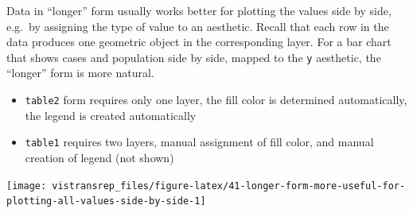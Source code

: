 \documentclass[]{book}
\newenvironment{Shaded}{}{}
\newcommand{\DataTypeTok}[1]{#1}
\newcommand{\KeywordTok}[1]{\textcolor[rgb]{0.00,0.00,1.00}{#1}}
\newcommand{\NormalTok}[1]{#1}
\newcommand{\OperatorTok}[1]{#1}
\newcommand{\StringTok}[1]{\textcolor[rgb]{0.00,0.50,0.50}{#1}}
\providecommand{\tightlist}{%
  \setlength{\itemsep}{0pt}\setlength{\parskip}{0pt}}
\begin{document}
Data in ``longer'' form usually works better for plotting the values side by side, e.g.~by assigning the type of value to an aesthetic.
Recall that each row in the data produces one geometric object in the corresponding layer.
For a bar chart that shows cases and population side by side, mapped to the \texttt{y} aesthetic, the ``longer'' form is more natural.

\begin{itemize}
\tightlist
\item
  \texttt{table2} form requires only one layer, the fill color is determined automatically, the legend is created automatically
\item
  \texttt{table1} requires two layers, manual assignment of fill color, and manual creation of legend (not shown)
\end{itemize}

\begin{Shaded}
\end{Shaded}

\begin{flushright}\texttt{[image: vistransrep\_files/figure-latex/41-longer-form-more-useful-for-plotting-all-values-side-by-side-1]} \end{flushright}

\begin{Shaded}
\end{Shaded}
\end{document}
